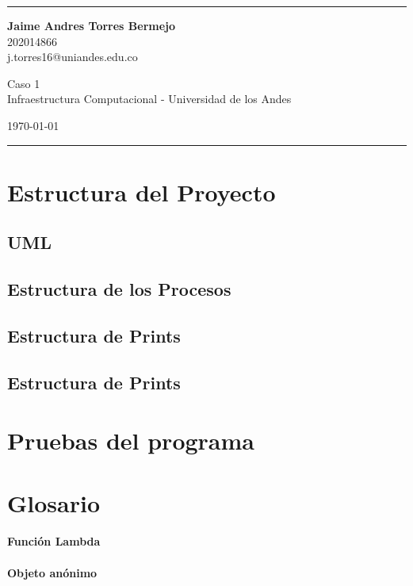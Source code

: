 \documentclass[a4paper]{article}
\begin{document}

\fancyhead[C]{}
\hrule \medskip %
\begin{minipage}{0.295\textwidth} 
\raggedright
\footnotesize
\textbf{Jaime Andres Torres Bermejo} \hfill\\   
202014866\hfill\\
j.torres16@uniandes.edu.co



\end{minipage}
\begin{minipage}{0.4\textwidth} 
\centering 
\large 
Caso 1\\ 
\normalsize 
Infraestructura Computacional - Universidad de los Andes\\ 
\end{minipage}
\begin{minipage}{0.295\textwidth} 
\raggedleft
\today\hfill\\
\end{minipage}
\medskip\hrule 
\bigskip


\section{Estructura del Proyecto}
    
    \subsection{UML}
    
    \subsection{Estructura de los Procesos}
    
    \subsection{Estructura de Prints}
    
    \subsection{Estructura de Prints}

\section{Pruebas del programa}

\section{Glosario}
\paragraph{Función Lambda}

\paragraph{Objeto anónimo}


\end{document}
